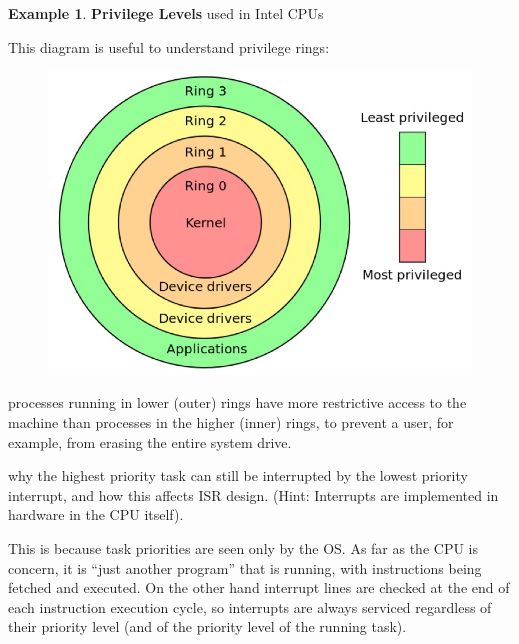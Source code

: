 \documentclass[11pt,a4paper]{article}
\theoremstyle{definition}
\newtheorem{example}{Example}[section]
\begin{document}
\begin{example}{\textbf{Privilege Levels}  used in Intel CPUs}
	
	This diagram is useful to understand privilege rings:
	
	\begin{figure}[!h]
		\includegraphics[scale=0.2]{m1/privilegeRing}
		\centering
	\end{figure}
	
	processes running in lower (outer) rings have more restrictive access to the machine than processes in the higher (inner) rings, to prevent a user, for example, from erasing the entire system drive.
	
	\begin{tcolorbox}
		\textsf{why the highest priority task can still be interrupted by the lowest priority interrupt}, and how this affects ISR design. (Hint: Interrupts are implemented in hardware in the CPU itself).
		
		This is because task priorities are seen only by the OS. As far as the CPU is concern, it is “just another program” that is running, with instructions being fetched and executed. On the other hand interrupt lines are checked at the end of each instruction execution cycle, so interrupts are always serviced regardless of their priority level (and of the priority level of the running task).
	\end{tcolorbox}
\end{example}
\end{document}
